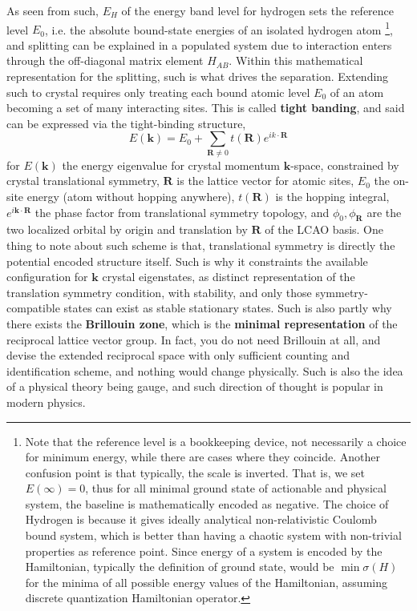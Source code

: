 As seen from such, $E_{H}$ of the energy band level for hydrogen sets the reference level $E_{0}$, i.e. the absolute bound-state energies of an isolated hydrogen atom \footnote{Note that the reference level is a bookkeeping device, not necessarily a choice for minimum energy, while there are cases where they coincide. Another confusion point is that typically, the scale is inverted. That is, we set $E(\infty)=0$, thus for all minimal ground state of actionable and physical system, the baseline is mathematically encoded as negative. The choice of Hydrogen is because it gives ideally analytical non-relativistic Coulomb bound system, which is better than having a chaotic system with non-trivial properties as reference point. Since energy of a system is encoded by the Hamiltonian, typically the definition of ground state, would be $\min{\sigma(H)}$ for the minima of all possible energy values of the Hamiltonian, assuming discrete quantization Hamiltonian operator.}, and splitting can be explained in a populated system due to interaction enters through the off-diagonal matrix element $H_{AB}$. Within this mathematical representation for the splitting, such is what drives the separation. Extending such to crystal requires only treating each bound atomic level $E_{0}$ of an atom becoming a set of many interacting sites. This is called \textbf{tight banding}, and said can be expressed via the tight-binding structure, 
\begin{equation}
    E(\mathbf{k}) = E_{0} + \sum_{\mathbf{R}\neq 0} t(\mathbf{R})e^{ik\cdot \mathbf{R}}
\end{equation}
for $E(\mathbf{k})$ the energy eigenvalue for crystal momentum $\mathbf{k}$-space, constrained by crystal translational symmetry, $\mathbf{R}$ is the lattice vector for atomic sites, $E_{0}$ the on-site energy (atom without hopping anywhere), $t(\mathbf{R})$ is the hopping integral, $e^{i\mathbf{k}\cdot \mathbf{R}}$ the phase factor from translational symmetry topology, and $\phi_{0},\phi_{\mathbf{R}}$ are the two localized orbital by origin and translation by $\mathbf{R}$ of the LCAO basis. One thing to note about such scheme is that, translational symmetry is directly the potential encoded structure itself. Such is why it constraints the available configuration for $\mathbf{k}$ crystal eigenstates, as distinct representation of the translation symmetry condition, with stability, and only those symmetry-compatible states can exist as stable stationary states. Such is also partly why there exists the \textbf{Brillouin zone}, which is the \textbf{minimal representation} of the reciprocal lattice vector group. In fact, you do not need Brillouin at all, and devise the extended reciprocal space with only sufficient counting and identification scheme, and nothing would change physically. Such is also the idea of a physical theory being gauge, and such direction of thought is popular in modern physics. 

